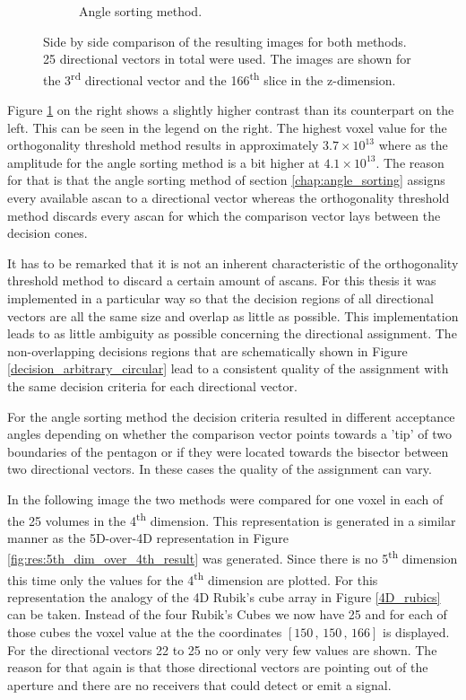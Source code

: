 \begin{figure}[H]
\begin{subfigure}[b]{0.49\textwidth}
         \caption{Angle sorting method.}
         \label{fig:res:slice_diff_bubble_ortho_imagebubble}
     \end{subfigure}
        \caption{Side by side comparison of the resulting images for both methods. 25 directional vectors in total were used. The images are shown for the 3\textsuperscript{rd} directional vector and the 166\textsuperscript{th} slice in the z-dimension.}
        \label{fig:res:slice_diff_bubble_ortho_image}
\end{figure}


Figure \ref{fig:res:slice_diff_bubble_ortho_imagebubble} on the right shows a slightly higher contrast than its counterpart on the left. This can be seen in the legend on the right. The highest voxel value for the orthogonality threshold method results in approximately $3.7\times 10^{13}$ where as the amplitude for the angle sorting method is a bit higher at $4.1\times 10^{13}$. The reason for that is that the angle sorting method of section \ref{chap:angle_sorting} assigns every available \ac{ascan} to a directional vector whereas the orthogonality threshold method discards every \ac{ascan} for which the comparison vector lays between the decision cones. 

It has to be remarked that it is not an inherent characteristic of the orthogonality threshold method to discard a certain amount of \acp{ascan}. For this thesis it was implemented in a particular way so that the decision regions of all directional vectors are all the same size and overlap as little as possible. This implementation leads to as little ambiguity as possible concerning the directional assignment. The non-overlapping decisions regions that are schematically shown in Figure \ref{decision_arbitrary_circular} lead to a consistent quality of the assignment with the same decision criteria for each directional vector. 

For the angle sorting method the decision criteria resulted in different acceptance angles depending on whether the comparison vector points towards a 'tip' of two boundaries of the pentagon or if they were located towards the bisector between two directional vectors. In these cases the quality of the assignment can vary.

\bigskip

In the following image the two methods were compared for one voxel in each of the 25 volumes in the 4\textsuperscript{th} dimension. This representation is generated in a similar manner as the 5D-over-4D representation in Figure \ref{fig:res:5th_dim_over_4th_result} was generated. Since there is no 5\textsuperscript{th} dimension this time only the values for the 4\textsuperscript{th} dimension are plotted. For this representation the analogy of the 4D Rubik's cube array in Figure \ref{4D_rubics} can be taken. Instead of the four Rubik's Cubes we now have 25 and for each of those cubes the voxel value at the the coordinates $[150\, , \, 150\, , \, 166]$ is displayed. For the directional vectors 22 to 25 no or only very few values are shown. The reason for that again is that those directional vectors are pointing out of the aperture and there are no receivers that could detect or emit a signal. 


